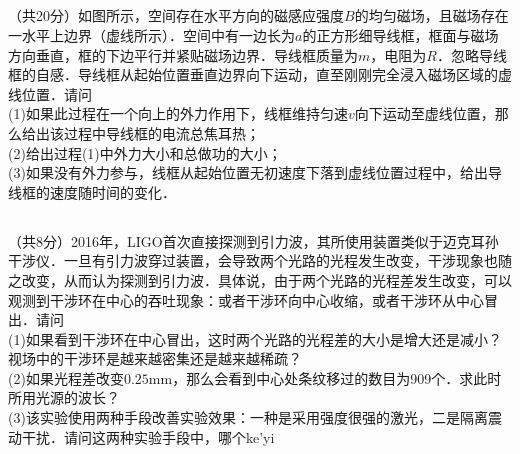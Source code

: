 \subsection{ }
（共20分）如图所示，空间存在水平方向的磁感应强度$B$的均匀磁场，且磁场存在一水平上边界（虚线所示）．空间中有一边长为$a$的正方形细导线框，框面与磁场方向垂直，框的下边平行并紧贴磁场边界．导线框质量为$m$，电阻为$R$．忽略导线框的自感．导线框从起始位置垂直边界向下运动，直至刚刚完全浸入磁场区域的虚线位置．请问\\
(1)如果此过程在一个向上的外力作用下，线框维持匀速$v$向下运动至虚线位置，那么给出该过程中导线框的电流总焦耳热；\\
(2)给出过程(1)中外力大小和总做功的大小；\\
(3)如果没有外力参与，线框从起始位置无初速度下落到虚线位置过程中，给出导线框的速度随时间的变化．
\subsection{ }
（共8分）2016年，LIGO首次直接探测到引力波，其所使用装置类似于迈克耳孙干涉仪．一旦有引力波穿过装置，会导致两个光路的光程发生改变，干涉现象也随之改变，从而认为探测到引力波．具体说，由于两个光路的光程差发生改变，可以观测到干涉环在中心的吞吐现象：或者干涉环向中心收缩，或者干涉环从中心冒出．请问\\
(1)如果看到干涉环在中心冒出，这时两个光路的光程差的大小是增大还是减小？视场中的干涉环是越来越密集还是越来越稀疏？\\
(2)如果光程差改变$0.25\mathrm{mm}$，那么会看到中心处条纹移过的数目为909个．求此时所用光源的波长？\\
(3)该实验使用两种手段改善实验效果：一种是采用强度很强的激光，二是隔离震动干扰．请问这两种实验手段中，哪个ke'yi